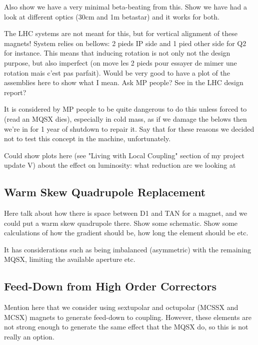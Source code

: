 Also show we have a very minimal beta-beating from this.
Show we have had a look at different optics (30cm and 1m betastar) and it works for both.


The LHC systems are not meant for this, but for vertical alignment of these magnets!
System relies on bellows: 2 pieds IP side and 1 pied other side for Q2 for instance.
This means that inducing rotation is not only not the design purpose, but also imperfect (on move les 2 pieds pour essayer de mimer une rotation mais c'est pas parfait).
Would be very good to have a plot of the assemblies here to show what I mean. Ask MP people? See in the LHC design report?

It is considered by MP people to be quite dangerous to do this unless forced to (read an MQSX dies), especially in cold mass, as if we damage the belows then we're in for 1 year of shutdown to repair it.
Say that for these reasons we decided not to test this concept in the machine, unfortunately.

Could show plots here (see "Living with Local Coupling" section of my project update V) about the effect on luminosity: what reduction are we looking at 

\subsection{Warm Skew Quadrupole Replacement}

Here talk about how there is space between D1 and TAN for a magnet, and we could put a warm skew quadrupole there.
Show some schematic.
Show some calculations of how the gradient should be, how long the element should be etc.

It has considerations such as being imbalanced (asymmetric) with the remaining MQSX, limiting the available aperture etc.

\subsection{Feed-Down from High Order Correctors}

Mention here that we consider using sextupolar and octupolar (MCSSX and MCSX) magnets to generate feed-down to coupling.
However, these elements are not strong enough to generate the same effect that the MQSX do, so this is not really an option.

